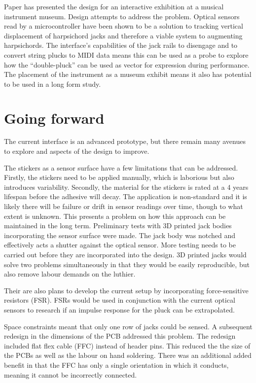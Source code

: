 Paper has presented the design for an interactive exhibition at a musical instrument museum. Design attempts to address the problem.
Optical sensors read by a microcontroller have been shown to be a solution to tracking vertical displacement of harpsichord jacks and therefore a viable system to augmenting harpsichords. The interface's capabilities of the jack rails to disengage and to convert string plucks to MIDI data means this can be used as a probe to explore how the ``double-pluck'' can be used as vector for expression during performance. The placement of the instrument as a museum exhibit means it also has potential to be used in a long form study.

\section{Going forward}\label{going-forward}

The current interface is an advanced prototype, but there remain many avenues to explore and aspects of the design to improve.

The stickers as a sensor surface have a few limitations that can be addressed. Firstly, the stickers need to be applied manually, which is laborious but also introduces variability. Secondly, the material for the stickers is rated at a 4 years lifespan before the adhesive will decay. The application is non-standard and it is likely there will be failure or drift in sensor readings over time, though to what extent is unknown. This presents a problem on how this approach can be maintained in the long term. Preliminary tests with 3D printed jack bodies incorporating the sensor surface were made. The jack body was notched and effectively acts a shutter against the optical sensor. More testing needs to be carried out before they are incorporated into the design. 3D printed jacks would solve two problems simultaneously in that they would be easily reproducible, but also remove labour demands on the luthier.

Their are also plans to develop the current setup by incorporating force-sensitive resistors (FSR). 
FSRs would be used in conjunction with the current optical sensors to research if an impulse response for the pluck can be extrapolated.


Space constraints meant that only one row of jacks could be sensed. A subsequent redesign in the dimensions of the PCB addressed this problem.
The redesign included flat flex cable (FFC) instead of header pins. This reduced the the size of the PCBs as well as the labour on hand soldering.
There was an additional added benefit in that the FFC has only a single orientation in which it conducts, meaning it cannot be incorrectly connected.

